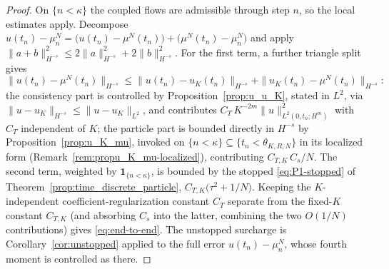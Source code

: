\documentclass[a4paper,fleqn]{cas-sc}
\theoremstyle{definition}
\theoremstyle{remark}
\begin{document}
\begin{proof}
On $\{n<\kappa\}$ the coupled flows are admissible through step $n$, so the local estimates apply.
Decompose $u(t_n)-\mu^N_n=\bigl(u(t_n)-\mu^N(t_n)\bigr)+\bigl(\mu^N(t_n)-\mu^N_n\bigr)$
and apply $\|a+b\|_{H^{-s}}^2\le2\|a\|_{H^{-s}}^2+2\|b\|_{H^{-s}}^2$. For the first
term, a further triangle split gives
\[
\|u(t_n)-\mu^N(t_n)\|_{H^{-s}}\le\|u(t_n)-u_K(t_n)\|_{H^{-s}}+\|u_K(t_n)-\mu^N(t_n)\|_{H^{-s}}:
\]
the consistency part is controlled by Proposition~\ref{prop:u_u_K}, stated in
$L^2$, via $\|u-u_K\|_{H^{-s}}\le\|u-u_K\|_{L^2}$, and contributes
$C_T\,K^{-2m}\|u\|_{L^2(0,t_n;H^m)}^2$ with $C_T$ independent of $K$; the
particle part is bounded directly in $H^{-s}$ by Proposition~\ref{prop:u_K_mu}, invoked on
$\{n<\kappa\}\subseteq\{t_n<\theta_{K,R,N}\}$ in its localized form (Remark~\ref{rem:propu_K_mu-localized}),
contributing $C_{T,K}\,C_s/N$. The second term, weighted by $\mathbf 1_{\{n<\kappa\}}$, is bounded by
the stopped \eqref{eq:P1-stopped} of Theorem~\ref{prop:time_discrete_particle},
$C_{T,K}\bigl(\tau^2+1/N\bigr)$. Keeping the $K$-independent
coefficient-regularization constant $C_T$ separate from the fixed-$K$ constant
$C_{T,K}$ (and absorbing $C_s$ into the latter, combining the two $O(1/N)$ contributions) gives
\eqref{eq:end-to-end}. The unstopped surcharge is Corollary~\ref{cor:unstopped} applied to the
full error $u(t_n)-\mu^N_n$, whose fourth moment is controlled as there.
\end{proof}
\end{document}
